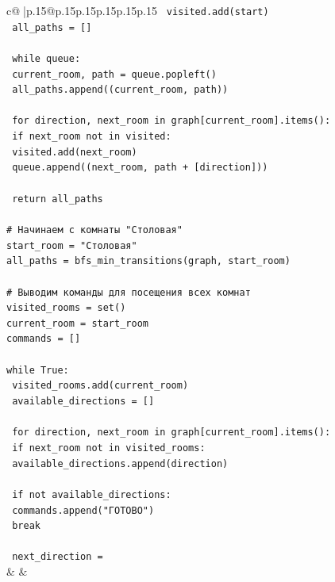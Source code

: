 \documentclass{article}
\begin{document}
{\begin{supertabular}{c@{$\;$}|p{.15\linewidth}@{}p{.15\linewidth}p{.15\linewidth}p{.15\linewidth}p{.15\linewidth}p{.15\linewidth}}
{{{\texttt{    visited.add(start)} \\
\texttt{    all\_paths = {[}{]}} \\
\\ 
\texttt{    while queue:} \\
\texttt{        current\_room, path = queue.popleft()} \\
\texttt{        all\_paths.append((current\_room, path))} \\
\\ 
\texttt{        for direction, next\_room in graph{[}current\_room{]}.items():} \\
\texttt{            if next\_room not in visited:} \\
\texttt{                visited.add(next\_room)} \\
\texttt{                queue.append((next\_room, path + {[}direction{]}))} \\
\\ 
\texttt{    return all\_paths} \\
\\ 
\texttt{\# Начинаем с комнаты "Столовая"} \\
\texttt{start\_room = "Столовая"} \\
\texttt{all\_paths = bfs\_min\_transitions(graph, start\_room)} \\
\\ 
\texttt{\# Выводим команды для посещения всех комнат} \\
\texttt{visited\_rooms = set()} \\
\texttt{current\_room = start\_room} \\
\texttt{commands = {[}{]}} \\
\\ 
\texttt{while True:} \\
\texttt{    visited\_rooms.add(current\_room)} \\
\texttt{    available\_directions = {[}{]}} \\
\\ 
\texttt{    for direction, next\_room in graph{[}current\_room{]}.items():} \\
\texttt{        if next\_room not in visited\_rooms:} \\
\texttt{            available\_directions.append(direction)} \\
\\ 
\texttt{    if not available\_directions:} \\
\texttt{        commands.append("ГОТОВО")} \\
\texttt{        break} \\
\\ 
\texttt{    next\_direction =} \\
            }
        }
    }
    & & \\ \\


\end{supertabular}}
\end{document}
